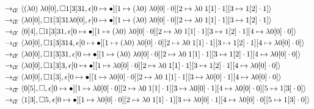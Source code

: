 \begin{sidewaysfigure}
\begin{align*}
&\rightarrow_{\mathcal{\mathcal{C} \mskip -4mu \mathcal{E}}}\langle (\lambda0)\;\lambda0[0],\square 1[3] 3 1,\epsilon[0\mapsto\bullet][1\mapsto(\lambda0)\;\lambda0[0]\cdot0][2\mapsto\lambda0\;1[1]\cdot1][3\mapsto1[2]\cdot1]\rangle\\ 
&\rightarrow_{\mathcal{\mathcal{C} \mskip -4mu \mathcal{E}}}\langle \lambda0[0],\square 1[3] 3 1 \lambda0[0],\epsilon[0\mapsto\bullet][1\mapsto(\lambda0)\;\lambda0[0]\cdot0][2\mapsto\lambda0\;1[1]\cdot1][3\mapsto1[2]\cdot1]\rangle\\ 
&\rightarrow_{\mathcal{\mathcal{C} \mskip -4mu \mathcal{E}}}\langle 0[4],\square 1[3] 3 1,\epsilon[0\mapsto\bullet][1\mapsto(\lambda0)\;\lambda0[0]\cdot0][2\mapsto\lambda0\;1[1]\cdot1][3\mapsto1[2]\cdot1][4\mapsto\lambda0[0]\cdot0]\rangle\\ 
&\rightarrow_{\mathcal{\mathcal{C} \mskip -4mu \mathcal{E}}}\langle \lambda0[0],\square 1[3] 3 1 4,\epsilon[0\mapsto\bullet][1\mapsto(\lambda0)\;\lambda0[0]\cdot0][2\mapsto\lambda0\;1[1]\cdot1][3\mapsto1[2]\cdot1][4\mapsto\lambda0[0]\cdot0]\rangle\\ 
&\rightarrow_{\mathcal{\mathcal{C} \mskip -4mu \mathcal{E}}}\langle \lambda0[0],\square 1[3] 3 1,\epsilon[0\mapsto\bullet][1\mapsto(\lambda0)\;\lambda0[0]\cdot0][2\mapsto\lambda0\;1[1]\cdot1][3\mapsto1[2]\cdot1][4\mapsto\lambda0[0]\cdot0]\rangle\\ 
&\rightarrow_{\mathcal{\mathcal{C} \mskip -4mu \mathcal{E}}}\langle \lambda0[0],\square 1[3] 3,\epsilon[0\mapsto\bullet][1\mapsto\lambda0[0]\cdot0][2\mapsto\lambda0\;1[1]\cdot1][3\mapsto1[2]\cdot1][4\mapsto\lambda0[0]\cdot0]\rangle\\ 
&\rightarrow_{\mathcal{\mathcal{C} \mskip -4mu \mathcal{E}}}\langle \lambda0[0],\square 1[3],\epsilon[0\mapsto\bullet][1\mapsto\lambda0[0]\cdot0][2\mapsto\lambda0\;1[1]\cdot1][3\mapsto\lambda0[0]\cdot1][4\mapsto\lambda0[0]\cdot0]\rangle\\ 
&\rightarrow_{\mathcal{\mathcal{C} \mskip -4mu \mathcal{E}}}\langle 0[5],\square,\epsilon[0\mapsto\bullet][1\mapsto\lambda0[0]\cdot0][2\mapsto\lambda0\;1[1]\cdot1][3\mapsto\lambda0[0]\cdot1][4\mapsto\lambda0[0]\cdot0][5\mapsto1[3]\cdot0]\rangle\\ 
&\rightarrow_{\mathcal{\mathcal{C} \mskip -4mu \mathcal{E}}}\langle 1[3],\square 5,\epsilon[0\mapsto\bullet][1\mapsto\lambda0[0]\cdot0][2\mapsto\lambda0\;1[1]\cdot1][3\mapsto\lambda0[0]\cdot1][4\mapsto\lambda0[0]\cdot0][5\mapsto1[3]\cdot0]\rangle\\ 

\end{align*}
\end{sidewaysfigure}
